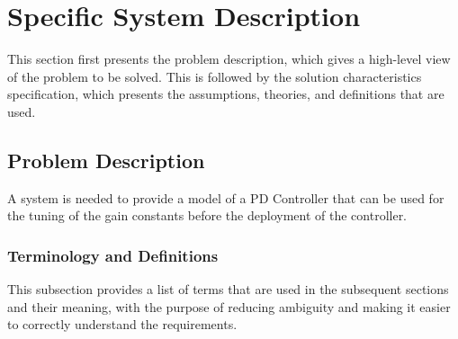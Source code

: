 \documentclass[12pt]{article}
\begin{document}
\section{Specific System Description}
\label{Sec:SpecSystDesc}
This section first presents the problem description, which gives a high-level view of the problem to be solved. This is followed by the solution characteristics specification, which presents the assumptions, theories, and definitions that are used.

\subsection{Problem Description}
\label{Sec:ProbDesc}
A system is needed to provide a model of a PD Controller  that can be used for the tuning of the gain constants before  the deployment of the controller.

\subsubsection{Terminology and Definitions}
\label{Sec:TermDefs}
This subsection provides a list of terms that are used in the subsequent sections and their meaning, with the purpose of reducing ambiguity and making it easier to correctly understand the requirements.
\end{document}
